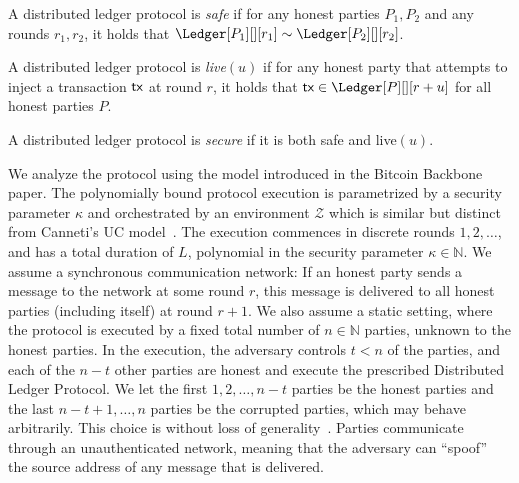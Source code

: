\begin{definition}[Safety]
  A distributed ledger protocol is \emph{safe} if
  for any honest parties $P_1, P_2$ and any rounds $r_1, r_2$, it holds that
  $\Ledger[P_1][][r_1] \sim \Ledger[P_2][][r_2]$.
\end{definition}

\begin{definition}[Liveness]
  A distributed ledger protocol is \emph{live}$(u)$ if
  for any honest party that attempts to inject a transaction $\textsf{tx}$
  at round $r$, it holds that $\tx \in \Ledger[P][][r+u]$
  for all honest parties $P$.
\end{definition}

\begin{definition}[Security]
  A distributed ledger protocol is \emph{secure} if it is
  both safe and live$(u)$.
\end{definition}

\noindent
{}
We analyze the protocol using the model introduced in the Bitcoin Backbone~\cite{backbone} paper.
The polynomially bound protocol execution is parametrized by a security parameter $\kappa$ and
orchestrated by an environment $\mathcal{Z}$ which is similar but distinct
from Canneti's UC model~\cite{uc}. The execution commences in discrete rounds $1, 2, \ldots$, and has a total duration of
$L$, polynomial in the security parameter $\kappa \in \mathbb{N}$.
We assume a synchronous communication network: If an honest party sends a message
to the network at some round $r$, this message is delivered to all honest parties
(including itself) at round $r + 1$.
We also assume a static setting, where the protocol is executed by
a fixed total number of $n \in \mathbb{N}$ parties, unknown to the honest parties.
In the execution, the adversary controls $t < n$ of the parties,
and each of the $n - t$ other parties are honest and execute the prescribed Distributed Ledger
Protocol. We let the first $1, 2, \ldots, n - t$ parties be the honest parties
and the last $n - t + 1, \ldots, n$ parties be the corrupted parties, which may behave arbitrarily.
This choice is without loss of generality~\cite[Proposition 18]{backbone}.
Parties communicate through an unauthenticated network,
meaning that the adversary can ``spoof''~\cite{douceur2002sybil}
the source address of any message that is delivered.


